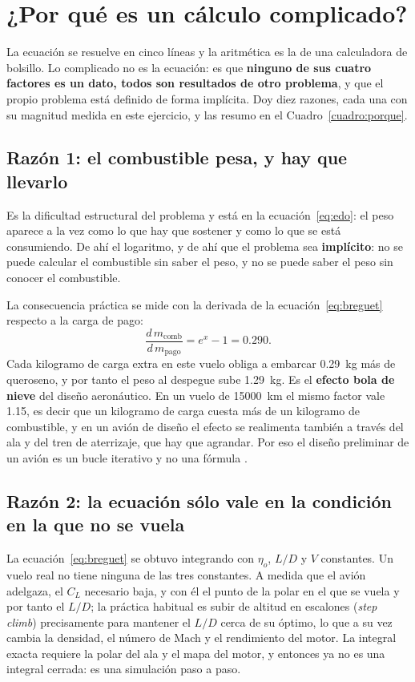 \documentclass[11pt,letterpaper]{article}
\begin{document}
\section{¿Por qué es un cálculo complicado?}
\label{sec:complicado}

La ecuación se resuelve en cinco líneas y la aritmética es la de una
calculadora de bolsillo. Lo complicado no es la ecuación: es que
\textbf{ninguno de sus cuatro factores es un dato, todos son resultados de otro
problema}, y que el propio problema está definido de forma implícita. Doy diez
razones, cada una con su magnitud medida en este ejercicio, y las resumo en el
Cuadro~\ref{cuadro:porque}.

\subsection{Razón 1: el combustible pesa, y hay que llevarlo}

Es la dificultad estructural del problema y está en la
ecuación~\eqref{eq:edo}: el peso aparece a la vez como lo que hay que sostener
y como lo que se está consumiendo. De ahí el logaritmo, y de ahí que el
problema sea \textbf{implícito}: no se puede calcular el combustible sin saber
el peso, y no se puede saber el peso sin conocer el combustible.

La consecuencia práctica se mide con la derivada de la
ecuación~\eqref{eq:breguet} respecto a la carga de pago:
\begin{equation}
\frac{d\,m_{\text{comb}}}{d\,m_{\text{pago}}} = e^{x}-1 = \num{0.290}.
\end{equation}
Cada kilogramo de carga extra en este vuelo obliga a embarcar
\SI{0.29}{\kilogram} más de queroseno, y por tanto el peso al despegue sube
\SI{1.29}{\kilogram}. Es el \textbf{efecto bola de nieve} del diseño
aeronáutico. En un vuelo de \SI{15000}{\kilo\meter} el mismo factor vale
\num{1.15}, es decir que un kilogramo de carga cuesta más de un kilogramo de
combustible, y en un avión de diseño el efecto se realimenta también a través
del ala y del tren de aterrizaje, que hay que agrandar. Por eso el diseño
preliminar de un avión es un bucle iterativo y no una fórmula
\parencite{raymer2018}.

\subsection{Razón 2: la ecuación sólo vale en la condición en la que no se
vuela}

La ecuación~\eqref{eq:breguet} se obtuvo integrando con \(\eta_o\), \(L/D\) y
\(V\) constantes. Un vuelo real no tiene ninguna de las tres constantes. A
medida que el avión adelgaza, el \(C_L\) necesario baja, y con él el punto de
la polar en el que se vuela y por tanto el \(L/D\); la práctica habitual es
subir de altitud en escalones (\emph{step climb}) precisamente para mantener el
\(L/D\) cerca de su óptimo, lo que a su vez cambia la densidad, el número de
Mach y el rendimiento del motor. La integral exacta requiere la polar del ala y
el mapa del motor, y entonces ya no es una integral cerrada: es una simulación
paso a paso.
\end{document}
